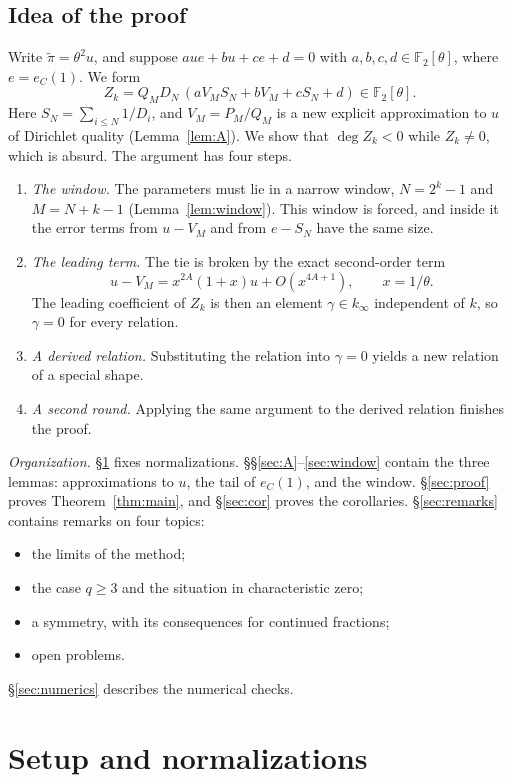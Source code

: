 \documentclass[11pt]{amsart}
\theoremstyle{remark}
\numberwithin{equation}{section}
\newcommand{\F}{\mathbb{F}}
\newcommand{\kinf}{k_\infty}
\newcommand{\pit}{\tilde\pi}
\newcommand{\eC}{e_C}
\begin{document}
\subsection{Idea of the proof}
Write $\pit=\theta^2u$, and suppose $aue+bu+ce+d=0$ with $a,b,c,d\in\F_2[\theta]$, where $e=\eC(1)$. We form
\[
Z_k=Q_MD_N\,(aV_MS_N+bV_M+cS_N+d)\in\F_2[\theta].
\]
Here $S_N=\sum_{i\le N}1/D_i$, and $V_M=P_M/Q_M$ is a new explicit approximation to $u$ of Dirichlet quality (Lemma~\ref{lem:A}). We show that $\deg Z_k<0$ while $Z_k\ne0$, which is absurd. The argument has four steps.
\begin{enumerate}
\item[(1)] \emph{The window.} The parameters must lie in a narrow window, $N=2^k-1$ and $M=N+k-1$ (Lemma~\ref{lem:window}). This window is forced, and inside it the error terms from $u-V_M$ and from $e-S_N$ have the same size.
\item[(2)] \emph{The leading term.} The tie is broken by the exact second-order term
 \[
 u-V_M=x^{2A}(1+x)u+O(x^{4A+1}),\qquad x=1/\theta .
 \]
 The leading coefficient of $Z_k$ is then an element $\gamma\in\kinf$ independent of $k$, so $\gamma=0$ for every relation.
\item[(3)] \emph{A derived relation.} Substituting the relation into $\gamma=0$ yields a new relation of a special shape.
\item[(4)] \emph{A second round.} Applying the same argument to the derived relation finishes the proof.
\end{enumerate}

\emph{Organization.} \S\ref{sec:setup} fixes normalizations. \S\S\ref{sec:A}--\ref{sec:window} contain the three lemmas: approximations to $u$, the tail of $\eC(1)$, and the window. \S\ref{sec:proof} proves Theorem~\ref{thm:main}, and \S\ref{sec:cor} proves the corollaries. \S\ref{sec:remarks} contains remarks on four topics:
\begin{itemize}
\item the limits of the method;
\item the case $q\ge3$ and the situation in characteristic zero;
\item a symmetry, with its consequences for continued fractions;
\item open problems.
\end{itemize}
\S\ref{sec:numerics} describes the numerical checks.

\section{Setup and normalizations}\label{sec:setup}
\end{document}
